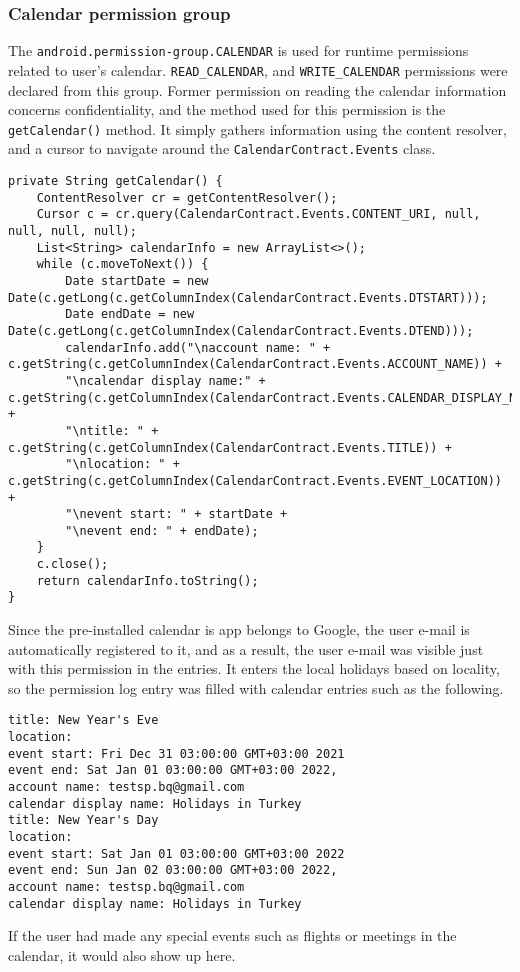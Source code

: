 \documentclass[
  a4paper,  %
  twoside,  %
  bibliography=totoc,
  headsepline,
  cleardoublepage=empty,
  parskip=half,
  draft=false,
  open=any
]{scrbook}
\begin{document}
\subsubsection{Calendar permission group}
The \texttt{android.permission-group.CALENDAR} is used for runtime permissions related to user's calendar. \texttt{READ\_CALENDAR}, and \texttt{WRITE\_CALENDAR} permissions were declared from this group. Former permission on reading the calendar information concerns confidentiality, and the method used for this permission is the \texttt{getCalendar()} method. It simply gathers information using the content resolver, and a cursor to navigate around the \texttt{CalendarContract.Events} class.
\begin{lstlisting}
private String getCalendar() {
	ContentResolver cr = getContentResolver();
	Cursor c = cr.query(CalendarContract.Events.CONTENT_URI, null, null, null, null);
	List<String> calendarInfo = new ArrayList<>();
	while (c.moveToNext()) {
		Date startDate = new Date(c.getLong(c.getColumnIndex(CalendarContract.Events.DTSTART)));
		Date endDate = new Date(c.getLong(c.getColumnIndex(CalendarContract.Events.DTEND)));
		calendarInfo.add("\naccount name: " + c.getString(c.getColumnIndex(CalendarContract.Events.ACCOUNT_NAME)) +
		"\ncalendar display name:" + c.getString(c.getColumnIndex(CalendarContract.Events.CALENDAR_DISPLAY_NAME)) +
		"\ntitle: " + c.getString(c.getColumnIndex(CalendarContract.Events.TITLE)) +
		"\nlocation: " + c.getString(c.getColumnIndex(CalendarContract.Events.EVENT_LOCATION)) +
		"\nevent start: " + startDate +
		"\nevent end: " + endDate);
	}
	c.close();
	return calendarInfo.toString();
}
\end{lstlisting}
Since the pre-installed calendar is app belongs to Google, the user e-mail is automatically registered to it, and as a result, the user e-mail was visible just with this permission in the entries. It enters the local holidays based on locality, so the permission log entry was filled with calendar entries such as the following.
\begin{lstlisting}
title: New Year's Eve
location: 
event start: Fri Dec 31 03:00:00 GMT+03:00 2021
event end: Sat Jan 01 03:00:00 GMT+03:00 2022, 
account name: testsp.bq@gmail.com
calendar display name: Holidays in Turkey
title: New Year's Day
location: 
event start: Sat Jan 01 03:00:00 GMT+03:00 2022
event end: Sun Jan 02 03:00:00 GMT+03:00 2022, 
account name: testsp.bq@gmail.com
calendar display name: Holidays in Turkey
\end{lstlisting}
If the user had made any special events such as flights or meetings in the calendar, it would also show up here.
\end{document}

